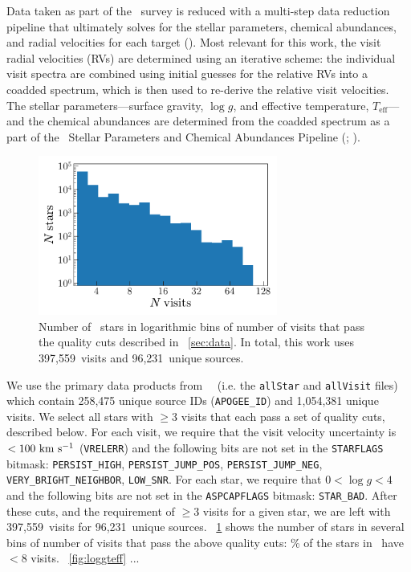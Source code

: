 \documentclass[modern, letterpaper]{aastex62}
\newcommand{\apogee}{\project{\acronym{APOGEE}}}
\newcommand{\DR}{\acronym{DR14}}
\newcommand{\nstars}{96,231}
\newcommand{\nvisits}{397,559}
\begin{document}
Data taken as part of the \apogee\ survey is reduced with a multi-step data
reduction pipeline that ultimately solves for the stellar parameters, chemical
abundances, and radial velocities for each target
(\citealt{Nidever:2015}).
Most relevant for this work, the visit radial velocities (RVs) are determined
using an iterative scheme: the individual visit spectra are combined using
initial guesses for the relative RVs into a coadded spectrum, which is then used
to re-derive the relative visit velocities.
The stellar parameters---surface gravity, $\log g$, and effective temperature,
$T_{\textrm{eff}}$---and the chemical abundances are determined from the coadded
spectrum as a part of the \apogee\ Stellar Parameters and Chemical Abundances
Pipeline (; \citealt{ASPCAP}).

\begin{figure}[h]
\begin{center}
\includegraphics[width=0.7\textwidth]{nvisits.pdf}
\end{center}
\caption{%
Number of \apogee\ stars in logarithmic bins of number of visits that pass the
quality cuts described in \sectionname~\ref{sec:data}.
In total, this work uses \nvisits\ visits and \nstars\ unique sources.
\label{fig:nvisits}
}
\end{figure}

We use the primary data products from \apogee\ \DR\ (i.e. the \texttt{allStar}
and \texttt{allVisit} files) which contain 258,475 unique source IDs
(\texttt{APOGEE\_ID}) and 1,054,381 unique visits.
We select all stars with $\geq 3$ visits that each pass a set of quality cuts,
described below.
For each visit, we require that the visit velocity uncertainty is $< 100~\mathrm{km}~\mathrm{s}^{-1}$
(\texttt{VRELERR}) and the following bits are not set in the \texttt{STARFLAGS}
bitmask: \texttt{PERSIST\_HIGH}, \texttt{PERSIST\_JUMP\_POS},
\texttt{PERSIST\_JUMP\_NEG}, \texttt{VERY\_BRIGHT\_NEIGHBOR}, \texttt{LOW\_SNR}.
For each star, we require that $0 < \log g < 4$ and the following bits are not
set in the \texttt{ASPCAPFLAGS} bitmask: \texttt{STAR\_BAD}.
After these cuts, and the requirement of $\geq 3$ visits for a given star, we
are left with \nvisits\ visits for \nstars\ unique sources.
\figurename~\ref{fig:nvisits} shows the number of stars in several bins of
number of visits that pass the above quality cuts: \% of the stars in
\DR\ have $< 8$ visits.
\figurename~\ref{fig:loggteff} ...
\end{document}
